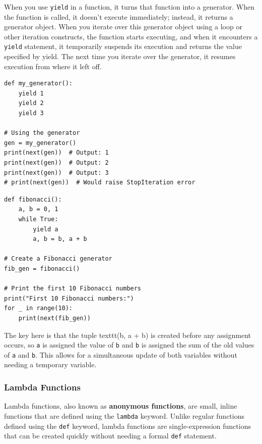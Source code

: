 When you use \texttt{yield} in a function, it turns that function into a generator. When the function is called, it doesn't execute immediately; instead, it returns a generator object. When you iterate over this generator object using a loop or other iteration constructs, the function starts executing, and when it encounters a \texttt{yield} statement, it temporarily suspends its execution and returns the value specified by yield. The next time you iterate over the generator, it resumes execution from where it left off.

\begin{codebox}
\begin{verbatim}
def my_generator():
    yield 1
    yield 2
    yield 3

# Using the generator
gen = my_generator()
print(next(gen))  # Output: 1
print(next(gen))  # Output: 2
print(next(gen))  # Output: 3
# print(next(gen))  # Would raise StopIteration error
\end{verbatim}
\end{codebox}

\begin{codebox}
\begin{verbatim}
def fibonacci():
    a, b = 0, 1
    while True:
        yield a
        a, b = b, a + b

# Create a Fibonacci generator
fib_gen = fibonacci()

# Print the first 10 Fibonacci numbers
print("First 10 Fibonacci numbers:")
for _ in range(10):
    print(next(fib_gen))
\end{verbatim}
\end{codebox}
The key here is that the tuple texttt{(b, a + b)} is created before any assignment occurs, so \texttt{a} is assigned the value of \texttt{b} and \texttt{b} is assigned the sum of the old values of \texttt{a} and \texttt{b}. This allows for a simultaneous update of both variables without needing a temporary variable.


\newpage
\subsubsection{Lambda Functions}
Lambda functions, also known as \textbf{anonymous functions}, are small, inline functions that are defined using the \texttt{lambda} keyword. Unlike regular functions defined using the \texttt{def} keyword, lambda functions are single-expression functions that can be created quickly without needing a formal \texttt{def} statement.

